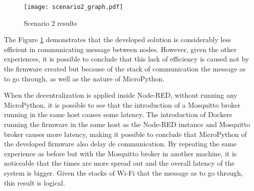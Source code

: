 \captionsetup{belowskip=12pt,aboveskip=4pt}
\begin{table}[ht]
    \centering
    \caption{Scenario 2 results}
    \label{tab:scenario2_table}
\end{table}{}

\begin{figure}[h]
\centering
\texttt{[image: scenario2\_graph.pdf]}
\caption[Scenario 2 results]{Scenario 2 results}\label{fig:scenario2_candlestick}
\end{figure}

The Figure \ref{fig:scenario2_candlestick} demonstrates that the developed solution is considerably less efficient in communicating message between nodes. However, given the other experiences, it is possible to conclude that this lack of efficiency is caused not by the firmware created but because of the stack of communication the message as to go through, as well as the nature of MicroPython. 

When the decentralization is applied inside Node-RED, without running any MicroPython, it is possible to see that the introduction of a Mosquitto broker running in the same host causes some latency. The introduction of Dockers running the firmware in the same host as the Node-RED instance and Mosquitto broker causes more latency, making it possible to conclude that MicroPython of the developed firmware also delay de communication. By repeating the same experience as before but with the Mosquitto broker in another machine, it is noticeable that the times are more spread out and the overall latency of the system is bigger. Given the stacks of Wi-Fi that the message as to go through, this result is logical.

